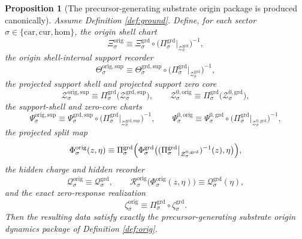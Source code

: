 \documentclass[11pt]{article}
\newcommand{\Car}{\mathrm{car}}
\newcommand{\Cur}{\mathrm{cur}}
\newcommand{\Hom}{\mathrm{hom}}
\newcommand{\OrigChart}[1]{\Xi_{#1}^{\mathrm{orig}}}
\newcommand{\OrigSupport}[1]{\Theta_{#1}^{\mathrm{orig,sup}}}
\newcommand{\OrigSupportShell}[1]{\mathcal Z_{#1}^{\mathrm{orig,sup}}}
\newcommand{\OrigZeroCore}[1]{\mathcal Z_{#1}^{0,\mathrm{orig}}}
\newcommand{\OrigEqChart}[1]{\Psi_{#1}^{\mathrm{orig,sup}}}
\newcommand{\OrigZeroChart}[1]{\Psi_{#1}^{0,\mathrm{orig}}}
\newcommand{\OrigSplit}[1]{\Phi_{#1}^{\mathrm{orig}}}
\newcommand{\OrigCharge}[1]{\mathcal Q_{#1}^{\mathrm{orig}}}
\newcommand{\OrigResidual}[1]{\mathcal R_{#1}^{\mathrm{orig}}}
\newcommand{\OrigEmbed}[1]{\zeta_{#1}^{\mathrm{orig}}}
\newcommand{\GroundProj}[1]{\Pi_{#1}^{\mathrm{grd}}}
\newcommand{\GroundShellSet}[1]{\mathcal Z_{#1}^{\mathrm{grd}}}
\newcommand{\GroundChart}[1]{\Xi_{#1}^{\mathrm{grd}}}
\newcommand{\GroundSupport}[1]{\Theta_{#1}^{\mathrm{grd,sup}}}
\newcommand{\GroundSupportShell}[1]{\mathcal Z_{#1}^{\mathrm{grd,sup}}}
\newcommand{\GroundZeroCore}[1]{\mathcal Z_{#1}^{0,\mathrm{grd}}}
\newcommand{\GroundEqChart}[1]{\Psi_{#1}^{\mathrm{grd,sup}}}
\newcommand{\GroundZeroChart}[1]{\Psi_{#1}^{0,\mathrm{grd}}}
\newcommand{\GroundSplit}[1]{\Phi_{#1}^{\mathrm{grd}}}
\newcommand{\GroundCharge}[1]{\mathcal Q_{#1}^{\mathrm{grd}}}
\newcommand{\GroundEmbed}[1]{\zeta_{#1}^{\mathrm{grd}}}
\newtheorem{proposition}{Proposition}
\begin{document}
\begin{proposition}[The precursor-generating substrate origin package is produced canonically]
\label{prop:orig}
Assume Definition \ref{def:ground}. Define, for each sector \(\sigma\in\{\Car,\Cur,\Hom\}\), the origin shell chart
\begin{equation}
\OrigChart{\sigma}
\equiv
\GroundChart{\sigma}\circ
\bigl(\GroundProj{\sigma}\big|_{\GroundShellSet{\sigma}}\bigr)^{-1},
\label{eq:propinducedorigchart}
\end{equation}
the origin shell-internal support recorder
\begin{equation}
\OrigSupport{\sigma}
\equiv
\GroundSupport{\sigma}\circ
\bigl(\GroundProj{\sigma}\big|_{\GroundShellSet{\sigma}}\bigr)^{-1},
\label{eq:propinducedorigsupport}
\end{equation}
the projected support shell and projected support zero core
\begin{equation}
\OrigSupportShell{\sigma}
\equiv
\GroundProj{\sigma}\bigl(\GroundSupportShell{\sigma}\bigr),
\qquad
\OrigZeroCore{\sigma}
\equiv
\GroundProj{\sigma}\bigl(\GroundZeroCore{\sigma}\bigr),
\label{eq:propinducedorigshells}
\end{equation}
the support-shell and zero-core charts
\begin{equation}
\OrigEqChart{\sigma}
\equiv
\GroundEqChart{\sigma}\circ
\bigl(\GroundProj{\sigma}\big|_{\GroundSupportShell{\sigma}}\bigr)^{-1},
\qquad
\OrigZeroChart{\sigma}
\equiv
\GroundZeroChart{\sigma}\circ
\bigl(\GroundProj{\sigma}\big|_{\GroundZeroCore{\sigma}}\bigr)^{-1},
\label{eq:propinducedorigcharts}
\end{equation}
the projected split map
\begin{equation}
\OrigSplit{\sigma}(z,\eta)
\equiv
\GroundProj{\sigma}\Bigl(
\GroundSplit{\sigma}\bigl(
(\GroundProj{\sigma}\big|_{\GroundZeroCore{\sigma}})^{-1}(z),
\eta
\bigr)
\Bigr),
\label{eq:propinducedorigsplit}
\end{equation}
the hidden charge and hidden recorder
\begin{equation}
\OrigCharge{\sigma}
\equiv
\GroundCharge{\sigma},
\qquad
\OrigResidual{\sigma}\bigl(\OrigSplit{\sigma}(z,\eta)\bigr)
\equiv
\GroundCharge{\sigma}(\eta),
\label{eq:propinducedorigresidual}
\end{equation}
and the exact zero-response realization
\begin{equation}
\OrigEmbed{\sigma}
\equiv
\GroundProj{\sigma}\circ\GroundEmbed{\sigma}.
\label{eq:propinducedorigembed}
\end{equation}
Then the resulting data satisfy exactly the precursor-generating substrate origin dynamics package of Definition \ref{def:orig}.
\end{proposition}
\end{document}

